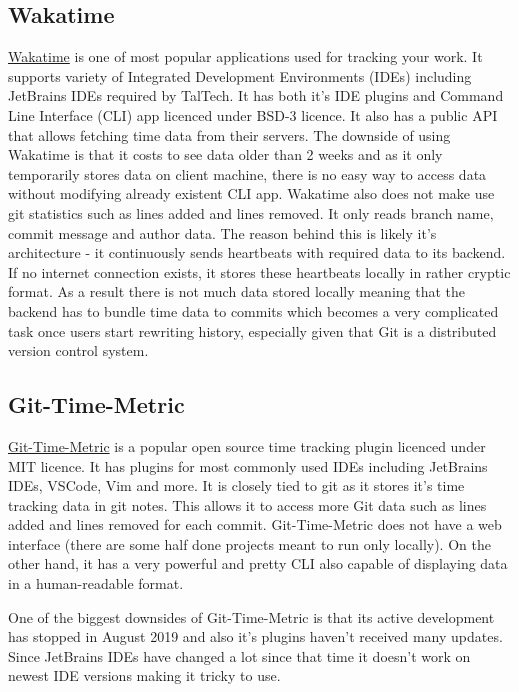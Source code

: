 \subsection{Wakatime}\label{subsec:wakatime}
\href{https://wakatime.com/about}{Wakatime} is one of most popular applications used for tracking your work.
It supports variety of Integrated Development Environments (IDEs) including JetBrains IDEs required by TalTech.
It has both it's IDE plugins and Command Line Interface (CLI) app licenced under BSD-3 licence.
It also has a public API that allows fetching time data from their servers.
The downside of using Wakatime is that it costs to see data older than 2 weeks and as it only temporarily
stores data on client machine, there is no easy way to access data without modifying already existent CLI app.
Wakatime also does not make use git statistics such as lines added and lines removed.
It only reads branch name, commit message and author data.
The reason behind this is likely it's architecture - it continuously sends heartbeats with required data to its backend.
If no internet connection exists, it stores these heartbeats locally in rather cryptic format.
As a result there is not much data stored locally meaning that the backend has to bundle time data to commits which becomes a very complicated task
once users start rewriting history, especially given that Git is a distributed version control system.


\subsection{Git-Time-Metric}\label{subsec:git-time-metric}
\href{https://github.com/git-time-metric/gtm}{Git-Time-Metric} is a popular open source time tracking plugin licenced under MIT licence.
It has plugins for most commonly used IDEs including JetBrains IDEs, VSCode, Vim and more.
It is closely tied to git as it stores it's time tracking data in git notes.
This allows it to access more Git data such as lines added and lines removed for each commit.
Git-Time-Metric does not have a web interface (there are some half done projects meant to run only locally).
On the other hand, it has a very powerful and pretty CLI also capable of displaying data in a human-readable format.

One of the biggest downsides of Git-Time-Metric is that its active development has stopped in August 2019 and also it's plugins haven't received many updates.
Since JetBrains IDEs have changed a lot since that time it doesn't work on newest IDE versions making it tricky to use.

